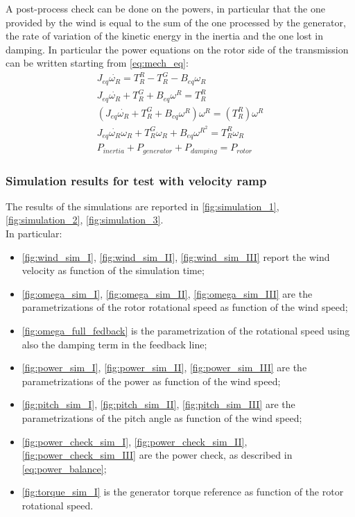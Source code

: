 A post-process check can be done on the powers, in particular that the one provided by the wind is equal to the sum of the one processed by the generator, the rate of variation of the kinetic energy in the inertia and the one lost in damping. In particular the power equations on the rotor side of the transmission can be written starting from \autoref{eq:mech_eq}:
\begin{gather}
    J_{eq}\dot{\omega_{R}} = T_R^R - T_R^G-B_{eq}\omega_R\\
    J_{eq}\dot{\omega_{R}} + T_R^G + B_{eq}\omega^R = T_R^R\\
    \left(J_{eq}\dot{\omega_{R}} + T_R^G + B_{eq}\omega^R\right)\omega^R = \left(T_R^R\right)\omega^R\\
    J_{eq}\dot{\omega_{R}}\omega_{R} + T_R^{G}\omega_{R} + B_{eq}\omega^{R^{2}} = T_R^{R}\omega_{R}\\
    P_{inertia} + P_{generator} + P_{damping} = P_{rotor} 
    \label{eq:power_balance}
\end{gather}

\subsubsection[Simulation results]{Simulation results for test with velocity ramp}
The results of the simulations are reported in \autoref{fig:simulation_1}, \ref{fig:simulation_2}, \ref{fig:simulation_3}. \\
In particular:
\begin{itemize}
  \item \autoref{fig:wind_sim_I}, \ref{fig:wind_sim_II}, \ref{fig:wind_sim_III} report the wind velocity as function of the simulation time;
  \item \autoref{fig:omega_sim_I}, \ref{fig:omega_sim_II}, \ref{fig:omega_sim_III} are the parametrizations of the rotor rotational speed as function of the wind speed;
  \item \autoref{fig:omega_full_fedback} is the parametrization of the rotational speed using also the damping term in the feedback line; 
  \item \autoref{fig:power_sim_I}, \ref{fig:power_sim_II}, \ref{fig:power_sim_III} are the parametrizations of the power as function of the wind speed;
  \item \autoref{fig:pitch_sim_I}, \ref{fig:pitch_sim_II}, \ref{fig:pitch_sim_III} are the parametrizations of the pitch angle as function of the wind speed;
  \item \autoref{fig:power_check_sim_I}, \ref{fig:power_check_sim_II}, \ref{fig:power_check_sim_III} are the power check, as described in \autoref{eq:power_balance};
  \item \autoref{fig:torque_sim_I} is the generator torque reference as function of the rotor rotational speed.
\end{itemize}

